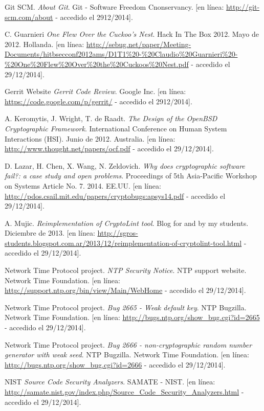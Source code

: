 \documentclass[11pt,a4paper]{article}
\begin{document}
\begin{thebibliography}{99}
	Git SCM.
	\emph{About Git}.
	Git - Software Freedom Cnonservancy.
	[en línea: \url{http://git-scm.com/about} - accedido el 2912/2014].

	C. Guarnieri
	\emph{One Flew Over the Cuckoo’s Nest}.
	Hack In The Box 2012.
	Mayo de 2012. Hollanda.
	[en línea: \url{http://sebug.net/paper/Meeting-Documents/hitbsecconf2012ams/D1T1%20-%20Claudio%20Guarnieri%20-%20One%20Flew%20Over%20the%20Cuckoos%20Nest.pdf} - accedido el 29/12/2014].

	Gerrit Website
	\emph{Gerrit Code Review}.
	Google Inc.
	[en línea: \url{https://code.google.com/p/gerrit/} - accedido el 2912/2014].
	
	 A. Keromytis, J. Wright, T. de Raadt.
	 \emph{The Design of the OpenBSD Cryptographic Framework}.
	 International Conference on Human System Interactions (HSI).
	 Junio de 2012. Australia.
	 [en línea: \url{http://www.thought.net/papers/ocf.pdf} - accedido el 29/12/2014].

	 D. Lazar, H. Chen, X. Wang, N. Zeldovich.
	 \emph{Why does cryptographic software fail?: a case study and open problems}.
	 Proceedings of 5th Asia-Pacific Workshop on Systems Article No. 7.
	 2014. EE.UU.
	 [en línea: \url{http://pdos.csail.mit.edu/papers/cryptobugs:apsys14.pdf} - accedido el 29/12/2014].

	 A. Mujic.
	 \emph{Reimplementation of CryptoLint tool}.
	 Blog for and by my students.
	 Diciembre de 2013.
	 [en línea: \url{http://sgros-students.blogspot.com.ar/2013/12/reimplementation-of-cryptolint-tool.html} - accedido el 29/12/2014].

	Network Time Protocol project.
	\emph{NTP Security Notice}.
	NTP support website. Network Time Foundation.
	[en línea: \url{http://support.ntp.org/bin/view/Main/WebHome} - accedido el 29/12/2014].

	Network Time Protocol project.
	\emph{Bug 2665 - Weak default key}.
	NTP Bugzilla. Network Time Foundation.
	[en línea: \url{http://bugs.ntp.org/show_bug.cgi?id=2665} - accedido el 29/12/2014].

	Network Time Protocol project.
	\emph{Bug 2666 - non-cryptographic random number generator with weak seed}.
	NTP Bugzilla. Network Time Foundation.
	[en línea: \url{http://bugs.ntp.org/show_bug.cgi?id=2666} - accedido el 29/12/2014].

	NIST
	\emph{Source Code Security Analyzers}.
	SAMATE - NIST.
	[en línea: \url{http://samate.nist.gov/index.php/Source_Code_Security_Analyzers.html} - accedido el 29/12/2014].


\end{thebibliography}
\end{document}
